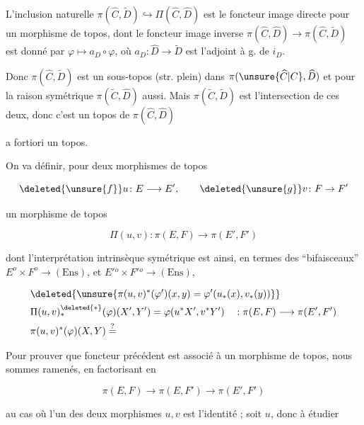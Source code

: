  L'inclusion naturelle $\pi(\widehat C,\widetilde D)\hookrightarrow\Pi(\widehat C,\widehat D)$  est le foncteur image directe pour un morphisme de topos, dont le foncteur image inverse  $\pi(\widehat C,\widehat D)\longrightarrow\pi(\widehat C,\widetilde D)$ est donné par $\varphi\longmapsto a_D\circ\varphi$, où $a_D\colon\widehat D\longrightarrow\widetilde D$ est l'adjoint à g. de $i_D$.

Donc $\pi(\widehat C,\widetilde D)$ est un sous-topos (str. plein) dans $\pi(\unsure{\widehat C|C},\widehat D)$ et pour la raison symétrique $\pi(\widetilde C,\widehat D)$ aussi. Mais $\pi(\widetilde C,\widetilde D)$ est l'intersection de ces deux, donc c'est un topos de $\pi(\widehat C,\widehat D)$

a fortiori un topos.


On va définir, pour deux morphismes de topos

\[
\deleted{\unsure{f}}u\colon E\longrightarrow E',\qquad \deleted{\unsure{g}}v\colon F\to F'
\]

un morphisme de topos

\[
\Pi(u,v)\colon\pi(E,F)\longrightarrow\pi(E',F')
\]

dont l'interprétation intrinsèque symétrique est ainsi, en termes des ``bifaisceaux'' $E^o\times F^o\longrightarrow(\mathrm{Ens})$, et $E'{}^o\times F'{}^o\longrightarrow(\mathrm{Ens})$,

\[
\begin{aligned}
&\deleted{\unsure{\pi(u,v)^*(\varphi')(x,y)=\varphi'(u_*(x),v_*(y))}}\\
&\Pi(u,v)_{\ast}^{\deleted{\ast}}(\varphi)(X',Y')=\varphi(u^*X',v^*Y')\quad:\pi(E,F)\longrightarrow\pi(E',F')\\
&\pi(u,v)^*(\varphi)(X,Y)\overset{?}{=}
\end{aligned}
\]

Pour prouver que  foncteur précédent est associé à un morphisme de topos, nous sommes ramenés, en  factorisant en

\[
\pi(E,F)\longrightarrow\pi(E,F')\longrightarrow\pi(E',F')
\]

au cas où l'un des deux morphismes $u,v$ est l'identité ; soit $u$, donc à étudier

